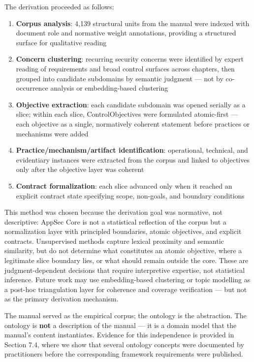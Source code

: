 \documentclass[
]{article}
\providecommand{\tightlist}{%
  \setlength{\itemsep}{0pt}\setlength{\parskip}{0pt}}
\begin{document}
The derivation proceeded as follows:

\begin{enumerate}
\def\labelenumi{\arabic{enumi}.}
\tightlist
\item
  \textbf{Corpus analysis}: 4,139 structural units from the manual were
  indexed with document role and normative weight annotations, providing
  a structured surface for qualitative reading
\item
  \textbf{Concern clustering}: recurring security concerns were
  identified by expert reading of requirements and broad control
  surfaces across chapters, then grouped into candidate subdomains by
  semantic judgment --- not by co-occurrence analysis or embedding-based
  clustering
\item
  \textbf{Objective extraction}: each candidate subdomain was opened
  serially as a slice; within each slice, ControlObjectives were
  formulated atomic-first --- each objective as a single, normatively
  coherent statement before practices or mechanisms were added
\item
  \textbf{Practice/mechanism/artifact identification}: operational,
  technical, and evidentiary instances were extracted from the corpus
  and linked to objectives only after the objective layer was coherent
\item
  \textbf{Contract formalization}: each slice advanced only when it
  reached an explicit contract state specifying scope, non-goals, and
  boundary conditions
\end{enumerate}

This method was chosen because the derivation goal was normative, not
descriptive: AppSec Core is not a statistical reflection of the corpus
but a normalization layer with principled boundaries, atomic objectives,
and explicit contracts. Unsupervised methods capture lexical proximity
and semantic similarity, but do not determine what constitutes an atomic
objective, where a legitimate slice boundary lies, or what should remain
outside the core. These are judgment-dependent decisions that require
interpretive expertise, not statistical inference. Future work may use
embedding-based clustering or topic modelling as a post-hoc
triangulation layer for coherence and coverage verification --- but not
as the primary derivation mechanism.

The manual served as the empirical corpus; the ontology is the
abstraction. The ontology is \textbf{not} a description of the manual
--- it is a domain model that the manual's content instantiates.
Evidence for this independence is provided in Section 7.4, where we show
that several ontology concepts were documented by practitioners before
the corresponding framework requirements were published.
\end{document}
